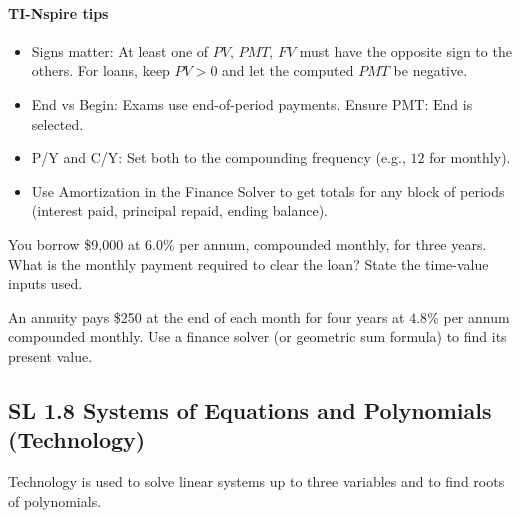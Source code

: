 \documentclass[11pt]{article}
\def\textbf#1{#1}%
\newcommand{\tocsubsection}[1]{\subsection{#1}}
\newcounter{question}
\begin{document}
\paragraph{TI-Nspire tips}
\begin{itemize}[itemsep=1pt]
  \item \textbf{Signs matter:} At least one of \(PV,\,PMT,\,FV\) must have the opposite sign to the others.
        For loans, keep \(PV>0\) and let the computed \(PMT\) be negative.
  \item \textbf{End vs Begin:} Exams use end-of-period payments. Ensure \(\text{PMT: End}\) is selected.
  \item \textbf{P/Y and C/Y:} Set both to the compounding frequency (e.g., \(12\) for monthly).
  \item Use \textbf{Amortization} in the Finance Solver to get totals for any block of periods
        (interest paid, principal repaid, ending balance).
\end{itemize}



\begin{question}
You borrow \$9{,}000 at $6.0\%$ per annum, compounded monthly, for three years.
What is the monthly payment required to clear the loan?  State the time-value
inputs used.
\end{question}

\begin{question}
An annuity pays \$250 at the end of each month for four years at
$4.8\%$ per annum compounded monthly.  Use a finance solver (or geometric sum
formula) to find its present value.
\end{question}

\tocsubsection{SL  1.8  \; Systems  of  Equations  and  Polynomials (Technology)}
Technology is used to solve linear systems up to three variables and to find
roots of polynomials.
\end{document}
